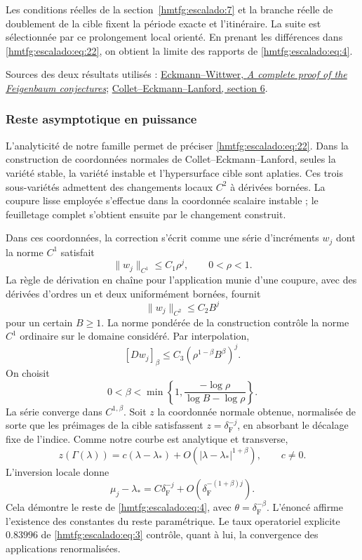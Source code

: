 Les conditions réelles de la section~\ref{hmtfg:escalado:7} et la branche réelle de doublement de la cible fixent la période exacte et l’itinéraire. La suite est sélectionnée par ce prolongement local orienté. En prenant les différences dans \eqref{hmtfg:escalado:eq:22}, on obtient la limite des rapports de \eqref{hmtfg:escalado:eq:4}.

Sources des deux résultats utilisés : \href{https://link.springer.com/article/10.1007/BF01013368}{Eckmann–Wittwer, \emph{A complete proof of the Feigenbaum conjectures}}; \href{https://people.math.harvard.edu/~knill/history/lanford/papers/ColletEckmannLanford.pdf}{Collet–Eckmann–Lanford, section 6}.

\subsubsection{Reste asymptotique en puissance}

L’analyticité de notre famille permet de préciser \eqref{hmtfg:escalado:eq:22}. Dans la construction de coordonnées normales de Collet–Eckmann–Lanford, seules la variété stable, la variété instable et l’hypersurface cible sont aplaties. Ces trois sous-variétés admettent des changements locaux \(C^2\) à dérivées bornées. La coupure lisse employée s’effectue dans la coordonnée scalaire instable ; le feuilletage complet s’obtient ensuite par le changement construit.

Dans ces coordonnées, la correction s’écrit comme une série d’incréments \(w_j\) dont la norme \(C^1\) satisfait
\[
\|w_j\|_{C^1}\le C_1\rho^j,\qquad 0<\rho<1.
\]
La règle de dérivation en chaîne pour l’application munie d’une coupure, avec des dérivées d’ordres un et deux uniformément bornées, fournit
\[
\|w_j\|_{C^2}\le C_2B^j
\]
pour un certain \(B\ge1\). La norme pondérée de la construction contrôle la norme \(C^1\) ordinaire sur le domaine considéré. Par interpolation,
\[
[Dw_j]_\beta\le C_3
\left(\rho^{1-\beta}B^\beta\right)^j.
\]
On choisit
\begin{equation}
0<\beta<\min\left\{1,
\frac{-\log\rho}{\log B-\log\rho}\right\}.
\label{hmtfg:escalado:eq:23}
\end{equation}
La série converge dans \(C^{1,\beta}\). Soit \(z\) la coordonnée normale obtenue, normalisée de sorte que les préimages de la cible satisfassent \(z=\delta_{\mathrm F}^{-j}\), en absorbant le décalage fixe de l’indice. Comme notre courbe est analytique et transverse,
\[
z(\Gamma(\lambda))=c(\lambda-\lambda_*)
+O(|\lambda-\lambda_*|^{1+\beta}),\qquad c\ne0.
\]
L’inversion locale donne
\begin{equation}
\mu_j-\lambda_*=C\delta_{\mathrm F}^{-j}
+O\left(\delta_{\mathrm F}^{-(1+\beta)j}\right).
\label{hmtfg:escalado:eq:24}
\end{equation}
Cela démontre le reste de \eqref{hmtfg:escalado:eq:4}, avec \(\theta=\delta_{\mathrm F}^{-\beta}\). L’énoncé affirme l’existence des constantes du reste paramétrique. Le taux operatoriel explicite \(0.83996\) de \eqref{hmtfg:escalado:eq:3} contrôle, quant à lui, la convergence des applications renormalisées.

